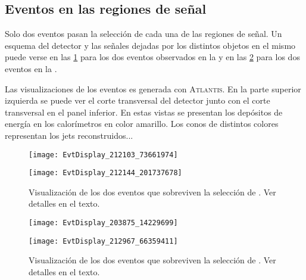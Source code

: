 \subsection{Eventos en las regiones de señal}

Solo dos eventos pasan la
selección de cada una de las regiones de señal. Un esquema del detector y las
se\~nales dejadas por los distintos objetos en el mismo puede verse en las
\cref{fig:evdisplay_srl} para los dos eventos observados en la {\SRL} y en las
\cref{fig:evdisplay_srh} para los dos eventos en la {\SRH}.

Las visualizaciones de los eventos es generada con
\textsc{Atlantis}\cite{atlantis}.
En la parte superior izquierda se puede ver el corte transversal del detector
junto con el corte transversal en el panel inferior. En estas vistas se presentan
los depósitos de energía en los calorímetros en color amarillo. Los conos de
distintos colores representan los jets reconstruidos...



\begin{figure}[!htbp]
  \begin{center}

    \texttt{[image: EvtDisplay\_212103\_73661974]}

    \vspace{1cm}

    \texttt{[image: EvtDisplay\_212144\_201737678]}

    \caption{Visualización de los dos eventos que sobreviven la selección de {\SRL}. Ver detalles en el texto.}
    \label{fig:evdisplay_srl}
  \end{center}
\end{figure}


\begin{figure}[!htbp]
  \begin{center}

    \texttt{[image: EvtDisplay\_203875\_14229699]}

    \vspace{1cm}

    \texttt{[image: EvtDisplay\_212967\_66359411]}

  \caption{Visualización de los dos eventos que sobreviven la selección de {\SRH}. Ver detalles en el texto.}
  \label{fig:evdisplay_srh}
  \end{center}
\end{figure}


